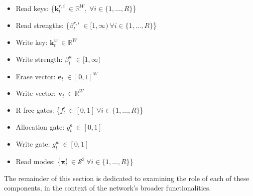 \documentclass[]{article}
\begin{document}
\vspace{10pt}
\hspace{-40pt}
\begin{minipage}{0.6\textwidth}
\begin{itemize}
\item Read keys: \{$\pmb{k}_t^{r,i} \ \in \mathbb{R}^W, \ \forall i \in \{1,\dots,R\}$\}
\item Read strengths: \{$\beta_t^{r,i} \ \in [1, \infty) \ \forall i \in \{1,\dots,R\}$\}
\item Write key: $\pmb{k}_t^w \ \in \mathbb{R}^W$
\item Write strength: $\beta_t^w \ \in [1, \infty)$
\item Erase vector: $\pmb{e}_t \ \in [0,1]^W$
\end{itemize}
\end{minipage}
\hspace{-20pt}
\begin{minipage}{0.5\textwidth}
\begin{itemize}
\item Write vector: $\pmb{v}_t \ \in \mathbb{R}^W$
\item R free gates: \{$f_t^i \ \in [0,1] \ \forall i \in \{1,\dots,R\}$\}
\item Allocation gate: $g_t^a \ \in [0,1]$
\item Write gate: $g_t^w \ \in [0,1]$
\item Read modes: \{$\pmb{\pi}_t^i \ \in \mathcal{S}^3 \ \forall i \in \{1,\dots,R\}$\}
\end{itemize}
\end{minipage}
\vspace{10pt}

The remainder of this section is dedicated to examining the role of each of these components, in the context of the network's broader functionalities.
\end{document}
